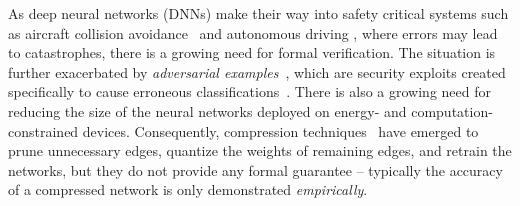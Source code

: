 \newcommand{\diffNN}{\textsc{ReluDiff}}
\newcommand{\ReluVal}{\textsc{ReluVal}}
\newcommand{\DeepPoly}{\textsc{DeepPoly}}

\newcommand{\Reluplex}{\textsc{Reluplex}}
\newcommand{\Neurify}{\textsc{Neurify}}
\newcommand{\RefineZono}{\textsc{RefineZono}}

\newcommand\UB[1]{\mathsf{UB}\big(#1\big)}
\newcommand\LB[1]{\mathsf{LB}\big(#1\big)}

\newcommand\UBconcrete[1]{\overline{\mathsf{UB}}\big(#1\big)}
\newcommand\LBconcrete[1]{\underline{\mathsf{LB}}\big(#1\big)}

\newcommand\ReLU[1]{\proc{ReLU}\left(#1\right)}
\newcommand\ReluOUT[1]{S(#1)}
\newcommand\ReluIN[1]{S^{in}(#1)}
\newcommand\ReluOUTdelta[1]{\delta(#1)}
\newcommand\ReluINdelta[1]{\delta^{in}(#1)}
\newcommand\EdgeOUTdelta[1]{\delta(#1)}

\newcommand\n[0]{n_{k,j}}
\newcommand\np[0]{n'_{k,j}}
\newcommand{\deq}{\Delta}
\newcommand{\deqh}{\hat{\Delta}}

\newcommand{\pluseq}{\mathrel{+}=}





\newcommand{\ignore}[1]{}
\newcommand{\textcode}[1]{\texttt{\footnotesize #1}}
\newcommand{\proc}[1]{\textsc{#1}}


As deep neural networks (DNNs) make their way into safety critical
systems such as aircraft collision avoidance~\cite{JulianKO18} and
autonomous driving \cite{bojarski2016end}, where errors may lead to
catastrophes, there is a growing need for formal verification.  The
situation is further exacerbated by \textit{adversarial
examples}~\cite{szegedy2013intriguing,GoodfellowSS15}, which are
security exploits created specifically to cause erroneous
classifications~\cite{NguyenYC15, XuQE16, Moosavi-Dezfooli16,
KurakinGB17a}.
%
There is also a growing need for reducing the size of the neural
networks deployed on energy- and computation-constrained devices.
Consequently, compression techniques~\cite{HanMD16} have emerged to
prune unnecessary edges, quantize the weights of remaining edges, and
retrain the networks, but they do not provide any formal guarantee --
typically the accuracy of a compressed network is only
demonstrated \textit{empirically}.


